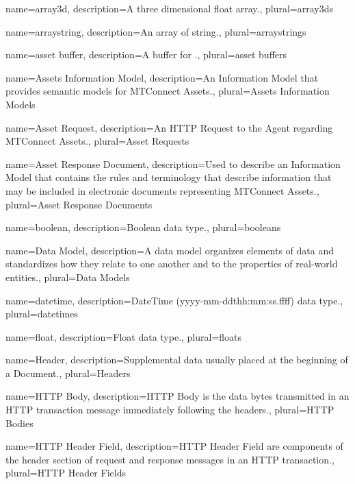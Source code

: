 
{
    name={array3d},
	description={A three dimensional \gls{float} array.},
	plural={array3ds}
}

{
    name={arraystring},
	description={An array of \gls{string}.},
	plural={arraystrings}
}

{
    name={asset buffer},
	description={A \gls{buffer} for .},
	plural={asset buffers}
}

{
    name={Assets Information Model},
	description={An {{Information Model}} that provides semantic models for \glspl{MTConnect Asset}.},
	plural={Assets Information Models}
}

{
    name={Asset Request},
	description={An \gls{HTTP Request} to the \gls{Agent} regarding \glspl{MTConnect Asset}.},
	plural={Asset Requests}
}

{
    name={Asset Response Document},
	description={Used to describe an \gls{Information Model} that contains the rules and terminology that describe information that may be included in electronic documents representing \glspl{MTConnect Asset}.},
	plural={Asset Response Documents}
}

{
    name={boolean},
	description={Boolean data type.},
	plural={booleans}
}

{
    name={Data Model},
	description={A data model organizes elements of data and standardizes how they relate to one another and to the properties of real-world entities.},
	plural={Data Models}
}

{
    name={datetime},
	description={DateTime (yyyy-mm-ddthh:mm:ss.ffff) data type.},
	plural={datetimes}
}

{
    name={float},
	description={Float data type.},
	plural={floats}
}

{
    name={Header},
	description={Supplemental data usually placed at the beginning of a \gls{Document}.},
	plural={Headers}
}

{
    name={HTTP Body},
	description={\gls{HTTP Body} is the data bytes transmitted in an HTTP transaction message immediately following the headers.},
	plural={HTTP Bodies}
}

{
    name={HTTP Header Field},
	description={\gls{HTTP Header Field} are components of the header section of request and response messages in an HTTP transaction.},
	plural={HTTP Header Fields}
}

